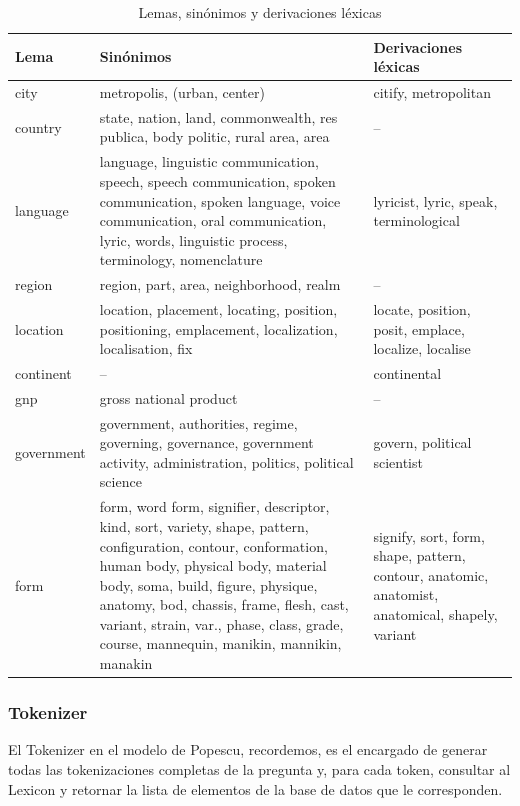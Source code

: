 \begin{center}
\begin{table}[h]
\centering
\begin{tabular}{| l |  p{9.5cm} | p{4cm} |} \hline
Lema & Sinónimos & Derivaciones léxicas\\ \hline
city 	&	metropolis, (urban, center)	&	citify, metropolitan\\ \hline
country	&	state, nation, land, commonwealth, res publica, body politic, rural area, area	&	--\\ \hline
language	&	language, linguistic communication, speech, speech communication, spoken communication, spoken language, voice communication, oral communication, lyric, words, linguistic process, terminology, nomenclature & lyricist, lyric, speak, terminological \\ \hline
region	&	region, part, area, neighborhood, realm	&	--\\ \hline
location	&	location, placement, locating, position, positioning, emplacement, localization, localisation, fix	&	locate, position, posit, emplace, localize, localise\\ \hline
continent	&	--	&	continental\\ \hline
gnp	&	gross national product	&	--\\ \hline
government	&	government, authorities, regime, governing, governance, government activity, administration, politics, political science	&	govern, political scientist\\ \hline
form	&	form, word form, signifier, descriptor, kind, sort, variety, shape, pattern, configuration, contour, conformation, human body, physical body, material body, soma, build, figure, physique, anatomy, bod, chassis, frame, flesh, cast, variant, strain, var., phase, class, grade, course, mannequin, manikin, mannikin, manakin	&	signify, sort, form, shape, pattern, contour, anatomic, anatomist, anatomical, shapely, variant\\ \hline
\end{tabular}
\caption{Lemas, sinónimos y derivaciones léxicas}
\label{table:sinonimos}
\end{table}
\end{center}

\subsubsection*{Tokenizer}
\label{subsubsec:tokenizer}

El Tokenizer en el modelo de Popescu, recordemos, es el encargado de generar todas las tokenizaciones completas de la pregunta y, para cada token, consultar al Lexicon y retornar la lista de elementos de la base de datos que le corresponden.

